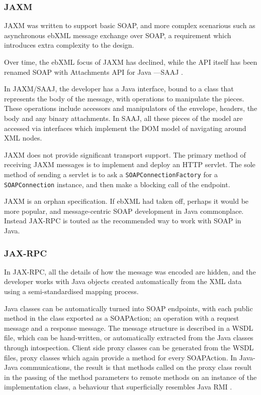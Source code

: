\subsubsection{JAXM}

JAXM was written to support basic SOAP, and more complex scenarious
such as asynchronous ebXML message exchange over SOAP, a requirement
which introduces extra complexity to the design. 

Over time, the ebXML focus of JAXM has declined, while the API itself
has been renamed  SOAP with Attachments API for Java ---SAAJ \cite{spec:SAAJ-12}. 

In JAXM/SAAJ, the developer has a Java interface, bound to a 
class that represents the body of the message, with operations to
manipulate the pieces. These operations include accessors and
manipulators of the envelope, headers, the body and any binary attachments. In
SAAJ, all these pieces of the model are accessed via interfaces which
implement the DOM \cite{spec:DOM} model of navigating around XML nodes.

JAXM does not provide significant transport support. The primary method
of receiving JAXM messages is to implement and deploy an HTTP servlet.
The sole method of sending a servlet is to ask a
\verb|SOAPConnectionFactory| for a \verb|SOAPConnection| instance, and
then make a blocking call of the endpoint.

JAXM is an orphan specification. If ebXML had taken off, perhaps it
would be more popular, and message-centric SOAP development in Java
commonplace. Instead JAX-RPC is touted as the recommended way to work
with SOAP in Java. 


\subsubsection{JAX-RPC}

In JAX-RPC, all the details of how the message was
encoded are hidden, and the developer works with Java objects created
automatically from the XML data using a semi-standardised mapping process.

Java classes can be automatically turned into SOAP endpoints, with each
public method in the class exported as a SOAPAction; an operation with a
request message and a response message. The message structure is
described in a WSDL file, which can be hand-written, or automatically
extracted from the Java classes through intospection. Client side
proxy classes can be generated from the WSDL files, proxy classes which
again provide a method for every SOAPAction. In Java-Java
communications, the result is that methods called on the proxy class
result in the passing of the method parameters to remote methods 
on an instance of the implementation class, a behaviour that superficially
resembles Java RMI \cite{paper:RMI}.

